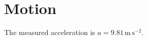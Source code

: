 \documentclass{article}
\begin{document}
\section{Motion}
The measured acceleration is $a = 9.81\,\mathrm{m\,s^{-2}}$.
\end{document}
